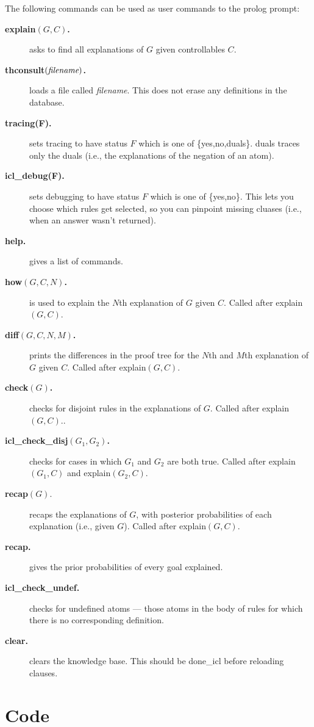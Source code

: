 \documentclass[11pt,fleqn]{article}
\newcommand{\btt}{\ttfamily\bfseries}
\begin{document}
The following commands can be used as
user commands to the prolog prompt:
\begin{description}
\item[{\btt explain$(G,C)$.}] asks to find all explanations of $G$
given controllables $C$.
\item[{\btt thconsult$(\hbox{\em filename})$.}] loads a file called
{\em filename}. This does not erase any definitions in the database.
\item[{\btt tracing(F).}] sets tracing to have status $F$ which is
one of {\ttfamily \{yes,no,duals\}}. {\ttfamily duals} traces only the
duals (i.e., the explanations of the negation of an atom).
\item[{\btt icl_debug(F).}] sets debugging to have status $F$ which is
one of {\ttfamily \{yes,no\}}. This lets you choose which rules get
selected, so you can pinpoint missing cluases (i.e., when an answer
wasn't returned).
\item[{\btt help.}] gives a list of commands.
\item[{\btt how$(G,C,N)$.}]
is used to explain the $N$th explanation of $G$ given $C$. Called
after {\ttfamily explain$(G,C)$.}
\item[{\btt diff$(G,C,N,M)$.}] 
prints the differences in the proof tree for the $N$th and $M$th
explanation of $G$ given $C$. Called after {\ttfamily explain$(G,C)$}.
\item[{\btt check$(G)$.}] 
checks for disjoint rules in the explanations of $G$.
 Called after {\ttfamily explain$(G,C)$.}.
\item[{\btt icl_check\_disj$(G_1,G_2)$.}] 
checks for cases in which $G_1$ and $G_2$ are both true.
 Called after {\ttfamily explain$(G_1,C)$} and {\ttfamily explain$(G_2,C)$}.
\item[{\btt recap$(G).$}] 
recaps the explanations of $G$, with posterior probabilities of each
 explanation (i.e., given $G$). 
 Called after {\ttfamily explain$(G,C)$}.
\item[{\btt recap.}] 
gives the prior probabilities of every goal explained.
\item[{\btt icl_check\_undef.}] checks for undefined atoms --- those atoms
in the body of rules for which there is no corresponding definition.
\item[{\btt clear.}] clears the knowledge base. This should be done_icl before reloading clauses.
\end{description}

\section{Code}
\end{document}
